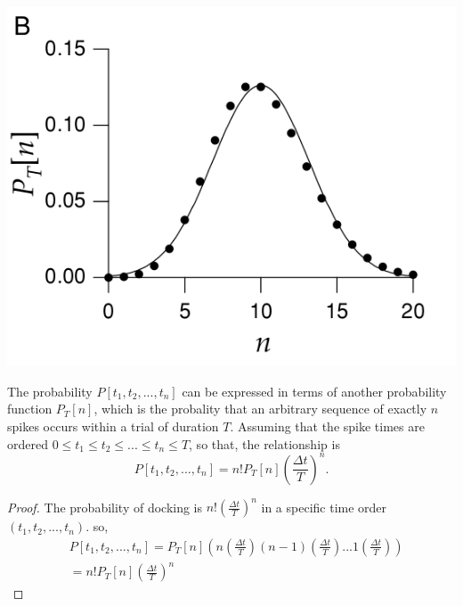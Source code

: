 \begin{center}
    \label{fig:1.12}            
    \includegraphics[scale = 0.36]{png/Figure1-11-B}\\    
\end{center}

\begin{thm}
    The probability $P[t_1,t_2,...,t_n]$ can be expressed in terms of another probability function $P_T[n]$, which is the probality that an arbitrary sequence of exactly $n$ spikes occurs within a trial of duration $T$. Assuming that the spike times are ordered $0\leq t_1\leq t_2\leq ...\leq t_n\leq T$, so that, the relationship is 
    \begin{equation}
        P[t_1,t_2,...,t_n]=n!{P_T[n]\left (\frac{\Delta t}{T}\right )^n}.
        \label{equ:1.26}
    \end{equation}
    \begin{proof}
        The probability of docking is $ n!(\frac{\Delta t}{T})^n $ in a specific time order $(t_1,t_2,...,t_n).$  so,
       \begin{align}       
         &P[t_1,t_2,...,t_n]={P_T[n]}(n(\frac{\Delta t}{T})(n-1)(\frac{\Delta t}{T})...1(\frac{\Delta t}{T}))\\
        &=n!{P_T[n]\left(\frac{\Delta t}{T}\right)^n}
    \end{align}
    \end{proof}
\end{thm}

